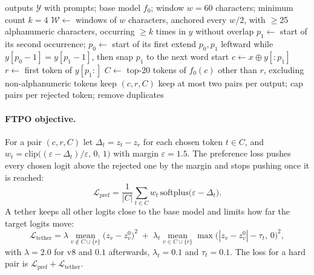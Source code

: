 \documentclass[11pt]{article}
\begin{document}
\begin{algorithm}[t]
\caption{Mining AntiDoom pairs from model outputs}
\label{alg:mining}
\small
\begin{algorithmic}[1]
\Require outputs $\mathcal{Y}$ with prompts; base model $f_0$; window $w{=}60$ characters; minimum count $k{=}4$
  \State $\mathcal{W} \gets$ windows of $w$ characters, anchored every $w/2$, with $\geq$25 alphanumeric characters, occurring $\geq k$ times in $y$ without overlap
    \State $p_1 \gets$ start of its second occurrence; $p_0 \gets$ start of its first
    \State extend $p_0, p_1$ leftward while $y[p_0{-}1] = y[p_1{-}1]$, then snap $p_1$ to the next word start
    \State $c \gets x \oplus y[{:}p_1]$ 
    \State $r \gets$ first token of $y[p_1{:}]$ 
    \State $C \gets$ top-20 tokens of $f_0(c)$ other than $r$, excluding non-alphanumeric tokens
      \State keep $(c, r, C)$ 
    \EndIf
  \EndFor
\EndFor
\State keep at most two pairs per output; cap pairs per rejected token; remove duplicates
\end{algorithmic}
\end{algorithm}

\paragraph{FTPO objective.} For a pair $(c, r, C)$ let $\Delta_t = z_t - z_r$ for each chosen token $t \in C$, and $w_t = \mathrm{clip}\big((\varepsilon - \Delta_t)/\varepsilon,\,0,\,1\big)$ with margin $\varepsilon = 1.5$. The preference loss pushes every chosen logit above the rejected one by the margin and stops pushing once it is reached:
\begin{equation}
\mathcal{L}_{\text{pref}} = \frac{1}{|C|}\sum_{t\in C} w_t\,\mathrm{softplus}\big(\varepsilon - \Delta_t\big).
\label{eq:ftpo}
\end{equation}
A tether keeps all other logits close to the base model and limits how far the target logits move:
\begin{equation}
\mathcal{L}_{\text{tether}} = \lambda \operatorname*{mean}_{v\notin C\cup\{r\}} \big(z_v - z^{0}_v\big)^2 \;+\; \lambda_t \operatorname*{mean}_{v\in C\cup\{r\}} \max\!\big(|z_v - z^{0}_v| - \tau_t,\,0\big)^2,
\label{eq:tether}
\end{equation}
with $\lambda = 2.0$ for v8 and $0.1$ afterwards, $\lambda_t = 0.1$ and $\tau_t = 0.1$. The loss for a hard pair is $\mathcal{L}_{\text{pref}} + \mathcal{L}_{\text{tether}}$.
\end{document}
